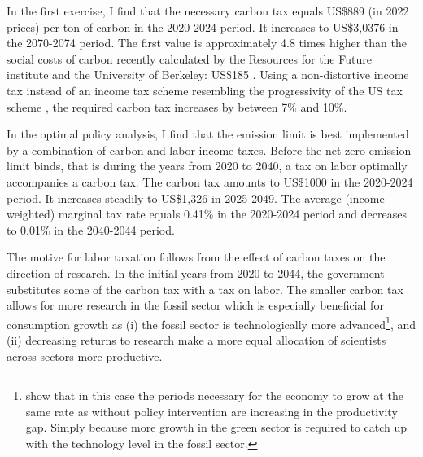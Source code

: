 In the first exercise, I find that the necessary carbon tax equals US\$889 (in 2022 prices) per ton of carbon in the 2020-2024 period. It increases to US\$3,0376 in the 2070-2074 period. The first value is approximately 4.8 times higher than the social costs of carbon recently calculated by the Resources for the Future institute and the University of Berkeley: US\$185 \citep{RFF}. Using a non-distortive income tax instead of an income tax scheme resembling the progressivity of the US tax scheme \citep[taken from][]{Heathcote2017OptimalFramework},  the required carbon tax increases by between 7\% and 10\%. 




In the optimal policy analysis, I find that the emission limit is best implemented by a combination of carbon and labor income taxes. 
Before the net-zero emission limit binds, that is during the years from 2020 to 2040, a tax on labor optimally accompanies a carbon tax. 
The carbon tax amounts to US\$1000 in the 2020-2024 period. It increases steadily to US\$1,326 in 2025-2049. The average (income-weighted) marginal tax rate equals 0.41\% in the 2020-2024 period and decreases to 0.01\% in the 2040-2044 period.

The motive for labor taxation follows from the effect of carbon taxes on the direction of research. In the initial years from 2020 to 2044, the government substitutes some of the carbon tax with a tax on labor. The smaller carbon tax allows for more research in the fossil sector which is especially beneficial for consumption growth as (i) the fossil sector is technologically more advanced\footnote{\citep{Acemoglu2012TheChange} show that in this case the periods necessary for the economy to grow at the same rate as without policy intervention are increasing in the productivity gap. Simply because more growth in the green sector is required  to catch up with the technology level in the fossil sector.}, and (ii) decreasing returns to research make a more equal allocation of scientists across sectors more productive. 
 
